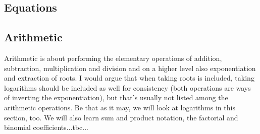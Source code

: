
%
% 



\subsection{Equations}

\subsection{Arithmetic}
Arithmetic is about performing the elementary operations of addition, subtraction, multiplication and division and on a higher level also exponentiation and extraction of roots. I would argue that when taking roots is included, taking logarithms should be included as well for consistency (both operations are ways of inverting the exponentiation), but that's usually not listed among the arithmetic operations. Be that as it may, we will look at logarithms in this section, too. We will also learn sum and product notation, the factorial and binomial coefficients...tbc...

%
%


